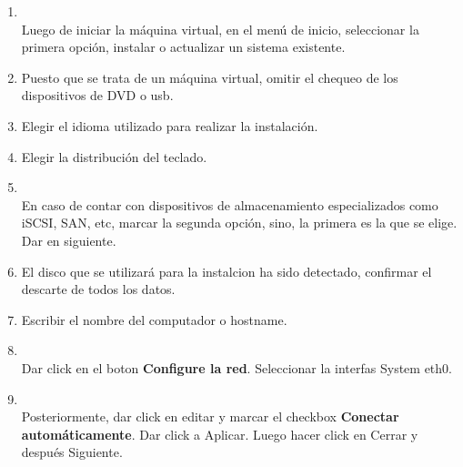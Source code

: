 \documentclass[11pt]{article}
\begin{document}
		\begin{enumerate}
			\item 
				\begin{minipage}[t]{\linewidth}
			          \raggedright
			          \medskip
			          \\Luego de iniciar la máquina virtual, en el menú de inicio, seleccionar la primera opción, instalar o actualizar un sistema existente.
			    \end{minipage}
			
			\item Puesto que se trata de un máquina virtual, omitir el chequeo de los dispositivos de DVD o usb.
			\item Elegir el idioma utilizado para realizar la instalación.
			\item Elegir la distribución del teclado.

			\item 
				\begin{minipage}[t]{\linewidth}
			          \raggedright
			          \medskip
			          \\En caso de contar con dispositivos de almacenamiento especializados como iSCSI, SAN, etc, marcar la segunda opción, sino, la primera es la que se elige. Dar en siguiente.
			    \end{minipage}			

			\item El disco que se utilizará para la instalcion ha sido detectado, confirmar el descarte de todos los datos.
			\item Escribir el nombre del computador o hostname.
			\item 				
				\begin{minipage}[t]{\linewidth}
			          \raggedright
			          \medskip
			          \\Dar click en el boton \textbf{Configure la red}. Seleccionar la interfas System eth0.
			    \end{minipage}	

			\item
				\begin{minipage}[t]{\linewidth}
			          \raggedright
			          \medskip
			          \\Posteriormente, dar click en editar y marcar el checkbox \textbf{Conectar automáticamente}. Dar click a Aplicar. Luego hacer click en Cerrar y después Siguiente.
			    \end{minipage}	


\end{enumerate}
\end{document}

